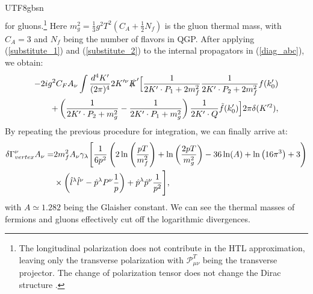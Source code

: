 \documentclass[11pt]{article}\def\baselinestretch{1.4}
\def\({\left(}
\def\){\right)}
\begin{document}
\begin{CJK}{UTF8}{gbsn}
\begin{align}
\end{align}
for gluons.\footnote{The longitudinal polarization does not contribute in the HTL approximation, leaving only the transverse polarization with $\mathcal{P}^T_{\mu \nu }$ being the transverse projector. The change of polarization tensor does not change the Dirac structure \cite{Lin:2023ass}.} Here $m_g^2=\frac{1}{3}g^2T^2(C_A+\frac{1}{2}N_f)$ is the gluon thermal mass, with $C_A=3$ and $N_f$ being the number of flavors in QGP.
 After applying (\ref{substitute_1}) and (\ref{substitute_2}) to the internal propagators in (\ref{diag_abc}), we obtain:
\begin{align}
\begin{split}
-2ig^2C_F A_\nu \int\frac{d^{4} K'}{( 2\pi )^{4}} 2K'^\nu \slashed{K}' \Big[ \frac{1}{2K'\cdot P_1+2m_f^2}\frac{1}{2K'\cdot P_2+2m_f^2}f(k'_0) \\
+ \left(\frac{1}{2K'\cdot P_2+m_g^2}-\frac{1}{2K'\cdot P_1+m_g^2}\right)\frac{1}{2K'\cdot Q}\tilde{f}(k'_0) \Big] 2\pi \delta (K'^2) ,
\end{split}
\end{align}
By repeating the previous procedure for integration, we can finally arrive at:
\begin{align}\label{vertex_corr}
\delta \Gamma_{vertex} ^\nu A_\nu =& 2 m_f^2 A_\nu \gamma _\lambda \Bigg{[} \frac{1}{6 p^2}\(2 \ln \left(\frac{pT}{m_f^2}\right)+\ln \left(\frac{2 pT}{m_{g }^2}\right) 
-36 \ln (A)+\ln \left(16 \pi ^3 \right)+3\)\nonumber\\
&\times\left(\hat{l}^\lambda \hat{l}^\nu - \hat{p}^\lambda P^\nu \frac{1}{p} \right) + \hat{p}^\lambda \hat{p}^\nu \frac{1}{p^2} \Bigg{]},
\end{align}
with $A\simeq 1.282$ being the Glaisher constant. We can see the thermal masses of fermions and gluons effectively cut off the logarithmic divergences.


\end{CJK}
\end{document}
